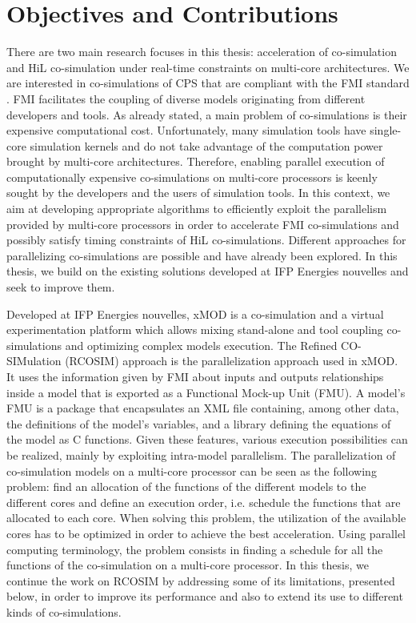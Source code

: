 \section{Objectives and Contributions}

There are two main research focuses in this thesis: acceleration of co-simulation and HiL co-simulation under real-time constraints on multi-core architectures. We are interested in co-simulations of CPS that are compliant with the FMI standard \cite{fmi:2014}. FMI facilitates the coupling of diverse models originating from different developers and tools. As already stated, a main problem of co-simulations is their expensive computational cost. Unfortunately, many simulation tools have single-core simulation kernels and do not take advantage of the computation power brought by multi-core architectures. Therefore, enabling parallel execution of computationally expensive co-simulations on multi-core processors is keenly sought by the developers and the users of simulation tools. In this context, we aim at developing appropriate algorithms to efficiently exploit the parallelism provided by multi-core processors in order to accelerate FMI co-simulations and possibly satisfy timing constraints of HiL co-simulations. Different approaches for parallelizing co-simulations are possible and have already been explored. In this thesis, we build on the existing solutions developed at IFP Energies nouvelles and seek to improve them. 

Developed at IFP Energies nouvelles, xMOD is a co-simulation and a virtual experimentation platform which allows mixing stand-alone and tool coupling co-simulations and optimizing complex models execution. The Refined CO-SIMulation (RCOSIM) approach \cite{benkhaled:2014} is the parallelization approach used in xMOD. It uses the information given by FMI about inputs and outputs relationships inside a model that is exported as a Functional Mock-up Unit (FMU). A model's FMU is a package that encapsulates an XML file containing, among other data, the definitions of the model's variables, and a library defining the equations of the model as C functions. Given these features, various execution possibilities can be realized, mainly by exploiting intra-model parallelism. The parallelization of co-simulation models on a multi-core processor can be seen as the following problem: find an allocation of the functions of the different models to the different cores and define an execution order, i.e. schedule the functions that are allocated to each core. When solving this problem, the utilization of the available cores has to be optimized in order to achieve the best acceleration. Using parallel computing terminology, the problem consists in finding a schedule for all the functions of the co-simulation on a multi-core processor. In this thesis, we continue the work on RCOSIM by addressing some of its limitations, presented below, in order to improve its performance and also to extend its use to different kinds of co-simulations.

